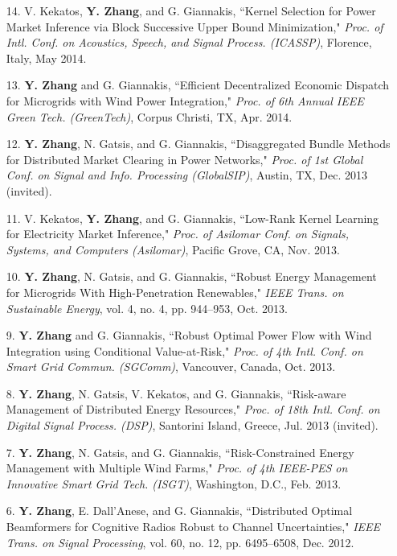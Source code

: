\documentclass[margin,line]{res}
\begin{document}
\begin{resume}
\begin{enumerate}
\item[14.]	V. Kekatos, \textbf{Y. Zhang}, and G. Giannakis,
``Kernel Selection for Power Market Inference via Block Successive Upper Bound Minimization,"
\emph{Proc. of Intl. Conf. on Acoustics, Speech, and Signal Process. (ICASSP)},
Florence, Italy, May 2014.

\item[13.]	\textbf{Y. Zhang} and G. Giannakis,
``Efficient Decentralized Economic Dispatch for Microgrids with Wind Power Integration,"
\emph{Proc. of 6th Annual IEEE Green Tech. (GreenTech)}, Corpus Christi, TX, Apr. 2014.


\item[12.]	\textbf{Y. Zhang}, N. Gatsis, and G. Giannakis,
``Disaggregated Bundle Methods for Distributed Market Clearing in Power Networks,"
\emph{Proc. of 1st Global Conf. on Signal and Info. Processing (GlobalSIP)}, Austin, TX, Dec. 2013 (invited).

\item[11.]	V. Kekatos, \textbf{Y. Zhang}, and G. Giannakis,
``Low-Rank Kernel Learning for Electricity Market Inference,"
\emph{Proc. of Asilomar Conf. on Signals, Systems, and Computers (Asilomar)}, Pacific Grove, CA, Nov. 2013.

\item[10.]	\textbf{Y. Zhang}, N. Gatsis, and G. Giannakis,
``Robust Energy Management for Microgrids With High-Penetration Renewables,"
\emph{IEEE Trans. on Sustainable Energy}, vol. 4, no. 4, pp. 944--953, Oct. 2013.

\item[9.]	\textbf{Y. Zhang} and G. Giannakis,
``Robust Optimal Power Flow with Wind Integration using Conditional Value-at-Risk,"
\emph{Proc. of 4th Intl. Conf. on Smart Grid Commun. (SGComm)}, Vancouver, Canada, Oct. 2013.

\item[8.]	\textbf{Y. Zhang}, N. Gatsis, V. Kekatos, and G. Giannakis,
``Risk-aware Management of Distributed Energy Resources,"
\emph{Proc. of 18th Intl. Conf. on Digital Signal Process. (DSP)}, Santorini Island, Greece, Jul. 2013 (invited).

\item[7.] \textbf{Y. Zhang}, N. Gatsis, and G. Giannakis,
``Risk-Constrained Energy Management with Multiple Wind Farms,"
\emph{Proc. of 4th IEEE-PES on Innovative Smart Grid Tech. (ISGT)}, Washington, D.C., Feb. 2013.

\item[6.]	\textbf{Y. Zhang}, E. Dall'Anese, and G. Giannakis,
``Distributed Optimal Beamformers for Cognitive Radios Robust to Channel Uncertainties,"
\emph{IEEE Trans. on Signal Processing}, vol. 60, no. 12, pp. 6495--6508, Dec. 2012.


\end{enumerate}
\end{resume}
\end{document}
